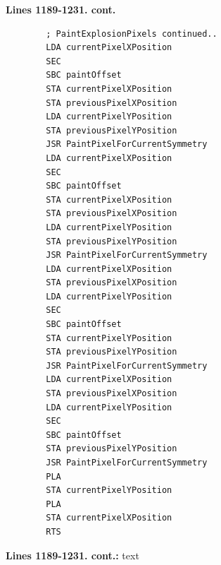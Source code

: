\textbf{Lines 1189-1231.  cont.} 
\begin{lstlisting}
        ; PaintExplosionPixels continued..
        LDA currentPixelXPosition
        SEC 
        SBC paintOffset
        STA currentPixelXPosition
        STA previousPixelXPosition
        LDA currentPixelYPosition
        STA previousPixelYPosition
        JSR PaintPixelForCurrentSymmetry
        LDA currentPixelXPosition
        SEC 
        SBC paintOffset
        STA currentPixelXPosition
        STA previousPixelXPosition
        LDA currentPixelYPosition
        STA previousPixelYPosition
        JSR PaintPixelForCurrentSymmetry
        LDA currentPixelXPosition
        STA previousPixelXPosition
        LDA currentPixelYPosition
        SEC 
        SBC paintOffset
        STA currentPixelYPosition
        STA previousPixelYPosition
        JSR PaintPixelForCurrentSymmetry
        LDA currentPixelXPosition
        STA previousPixelXPosition
        LDA currentPixelYPosition
        SEC 
        SBC paintOffset
        STA previousPixelYPosition
        JSR PaintPixelForCurrentSymmetry
        PLA 
        STA currentPixelYPosition
        PLA 
        STA currentPixelXPosition
        RTS 

\end{lstlisting}

\clearpage

\textbf{Lines 1189-1231.  cont.:} 
text
\clearpage



